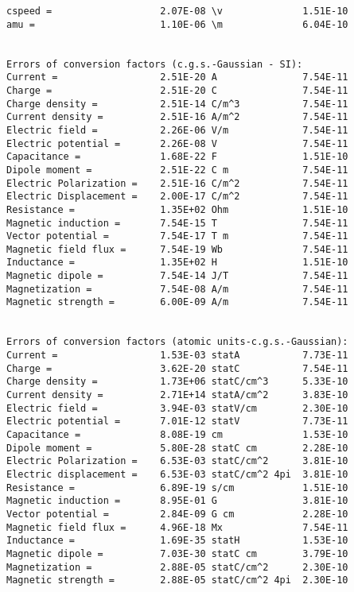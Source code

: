\documentclass[12pt,a4paper,twoside]{report}
\begin{document}
{\begin{tcolorbox}
\begin{verbatim}
cspeed =                   2.07E-08 \v              1.51E-10
amu =                      1.10E-06 \m              6.04E-10


Errors of conversion factors (c.g.s.-Gaussian - SI):
Current =                  2.51E-20 A               7.54E-11
Charge =                   2.51E-20 C               7.54E-11
Charge density =           2.51E-14 C/m^3           7.54E-11
Current density =          2.51E-16 A/m^2           7.54E-11
Electric field =           2.26E-06 V/m             7.54E-11
Electric potential =       2.26E-08 V               7.54E-11
Capacitance =              1.68E-22 F               1.51E-10
Dipole moment =            2.51E-22 C m             7.54E-11
Electric Polarization =    2.51E-16 C/m^2           7.54E-11
Electric Displacement =    2.00E-17 C/m^2           7.54E-11
Resistance =               1.35E+02 Ohm             1.51E-10
Magnetic induction =       7.54E-15 T               7.54E-11
Vector potential =         7.54E-17 T m             7.54E-11
Magnetic field flux =      7.54E-19 Wb              7.54E-11
Inductance =               1.35E+02 H               1.51E-10
Magnetic dipole =          7.54E-14 J/T             7.54E-11
Magnetization =            7.54E-08 A/m             7.54E-11
Magnetic strength =        6.00E-09 A/m             7.54E-11


Errors of conversion factors (atomic units-c.g.s.-Gaussian):
Current =                  1.53E-03 statA           7.73E-11
Charge =                   3.62E-20 statC           7.54E-11
Charge density =           1.73E+06 statC/cm^3      5.33E-10
Current density =          2.71E+14 statA/cm^2      3.83E-10
Electric field =           3.94E-03 statV/cm        2.30E-10
Electric potential =       7.01E-12 statV           7.73E-11
Capacitance =              8.08E-19 cm              1.53E-10
Dipole moment =            5.80E-28 statC cm        2.28E-10
Electric Polarization =    6.53E-03 statC/cm^2      3.81E-10
Electric displacement =    6.53E-03 statC/cm^2 4pi  3.81E-10
Resistance =               6.89E-19 s/cm            1.51E-10
Magnetic induction =       8.95E-01 G               3.81E-10
Vector potential =         2.84E-09 G cm            2.28E-10
Magnetic field flux =      4.96E-18 Mx              7.54E-11
Inductance =               1.69E-35 statH           1.53E-10
Magnetic dipole =          7.03E-30 statC cm        3.79E-10
Magnetization =            2.88E-05 statC/cm^2      2.30E-10
Magnetic strength =        2.88E-05 statC/cm^2 4pi  2.30E-10


\end{verbatim}
\end{tcolorbox}}
\end{document}
